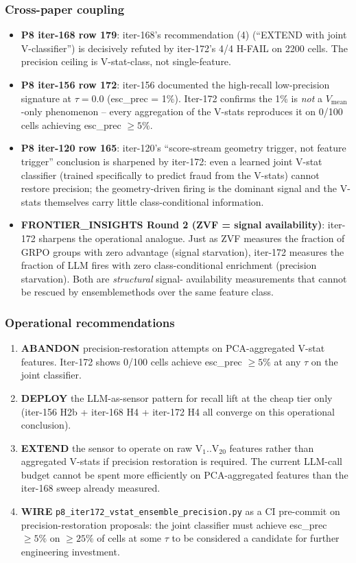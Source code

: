 \documentclass{article}
\begin{document}
\subsubsection{Cross-paper coupling}
\begin{itemize}
\item \textbf{P8 iter-168 row 179}: iter-168's recommendation (4)
(``EXTEND with joint V-classifier'') is decisively refuted by
iter-172's 4/4 H-FAIL on 2200 cells. The precision ceiling is
V-stat-class, not single-feature.
\item \textbf{P8 iter-156 row 172}: iter-156 documented the
high-recall low-precision signature at $\tau = 0.0$ (esc\_prec = 1\%).
Iter-172 confirms the 1\% is \emph{not} a $V_\mathrm{mean}$-only
phenomenon -- every aggregation of the V-stats reproduces it on
0/100 cells achieving esc\_prec $\geq 5\%$.
\item \textbf{P8 iter-120 row 165}: iter-120's ``score-stream geometry
trigger, not feature trigger'' conclusion is sharpened by iter-172:
even a learned joint V-stat classifier (trained specifically to
predict fraud from the V-stats) cannot restore precision; the
geometry-driven firing is the dominant signal and the V-stats
themselves carry little class-conditional information.
\item \textbf{FRONTIER\_INSIGHTS Round 2 (ZVF = signal availability)}:
iter-172 sharpens the operational analogue. Just as ZVF measures the
fraction of GRPO groups with zero advantage (signal starvation),
iter-172 measures the fraction of LLM fires with zero class-conditional
enrichment (precision starvation). Both are \emph{structural} signal-
availability measurements that cannot be rescued by ensemblemethods
over the same feature class.
\end{itemize}

\subsubsection{Operational recommendations}
\begin{enumerate}
\item \textbf{ABANDON} precision-restoration attempts on PCA-aggregated
V-stat features. Iter-172 shows 0/100 cells achieve esc\_prec $\geq 5\%$
at any $\tau$ on the joint classifier.
\item \textbf{DEPLOY} the LLM-as-sensor pattern for recall lift at the
cheap tier only (iter-156 H2b + iter-168 H4 + iter-172 H4 all converge
on this operational conclusion).
\item \textbf{EXTEND} the sensor to operate on raw V$_1$..V$_{20}$
features rather than aggregated V-stats if precision restoration is
required. The current LLM-call budget cannot be spent more efficiently
on PCA-aggregated features than the iter-168 sweep already measured.
\item \textbf{WIRE} \texttt{p8\_iter172\_vstat\_ensemble\_precision.py}
as a CI pre-commit on precision-restoration proposals: the joint
classifier must achieve esc\_prec $\geq 5\%$ on $\geq 25\%$ of cells
at some $\tau$ to be considered a candidate for further engineering
investment.
\end{enumerate}
\end{document}
